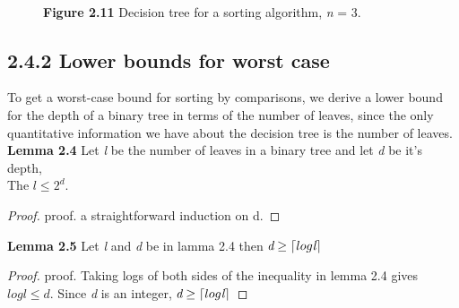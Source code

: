 \documentclass[a4paper,10pt,titlepage]{report}
\DeclarePairedDelimiter{\ceil}{\lceil}{\rceil}
\begin{document}
    
    
\begin{figure}[h]
\\
\caption{\textbf{Figure 2.11} Decision tree for a sorting algorithm, \textit{n} = 3.}
\end{figure}

\subsection{2.4.2 Lower bounds for worst case}

To get a worst-case bound for sorting by comparisons, we derive a lower bound for the depth of a binary tree in terms of the number of leaves, since the only quantitative information we have about the decision tree is the number of leaves. \\
\vspace{5mm}
\textbf{Lemma 2.4} Let \textit{l} be the number of leaves in a binary tree and let \textit{d} be it's depth, \\
The $\textit{l} \leq 2^d$.
\vspace{5mm}
\begin{proof}
proof. a straightforward induction on d.
\end{proof}




\vspace{5mm}
\textbf{Lemma 2.5} Let \textit{l} and \textit{d} be in lamma 2.4 then $\textit{d} \geq \ceil{log \textit{l}}$
\vspace{5mm}
\begin{proof}
proof. Taking logs of both sides of the inequality in lemma 2.4 gives $log \textit{l} \leq \textit{d}$. Since \textit{d} is an integer, $ \textit{d} \geq \ceil{log \textit{l}}$
\end{proof}
\end{document}
